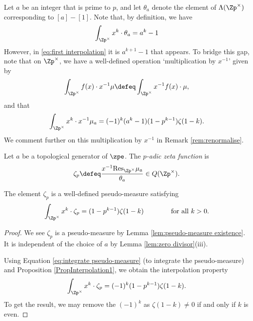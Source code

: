 \documentclass[a4paper,10pt, english, reqno]{smfart}
\numberwithin{equation}{section}
\begin{document}
\begin{definition}
Let $a$ be an integer that is prime to $p$, and let $\theta_{a}$ denote the element of $\Lambda(\Zp^\times)$ corresponding to $[a] - [1]$. Note that, by definition, we have
\[
\int_{\Zp^\times} x^k \cdot\theta_{a} = a^k - 1
\]
However, in \eqref{eq:first interpolation} it is $a^{k+1} -1$ that appears. To bridge this gap, note that on $\Zp^\times$, we have a well-defined operation `multiplication by $x^{-1}$' given by
\begin{equation}\label{eq:mult by xinverse}
	\int_{\Zp^\times} f(x) \cdot x^{-1}\mu \defeq \int_{\Zp^\times} x^{-1}f(x) \cdot \mu,
\end{equation}
and that 
\[
	\int_{\Zp^\times} x^k \cdot x^{-1} \mu_a = (-1)^k(a^k-1)(1-p^{k-1})\zeta(1-k).
\]
We comment further on this  multiplication by $x^{-1}$ in Remark \ref{rem:renormalise}. 

\begin{definition} \label{DefZetap}
Let $a$ be a topological generator of $\zpe$. The \emph{$p$-adic zeta function} is
\[
	\zeta_p \defeq \frac{x^{-1}\mathrm{Res}_{\Zp^\times}\mu_a}{\theta_a} \in Q(\Zp^\times).
\]
\end{definition}
\end{definition}





\begin{proposition} \label{PropInterpolation2}
The element $\zeta_p$ is a well-defined pseudo-measure satisfying
\[
\int_{\Zp^\times} x^k \cdot \zeta_p = (1-p^{k-1})\zeta(1-k) \qquad\qquad \text{for all }k > 0.
\]
\end{proposition}

\begin{proof}
We see $\zeta_p$ is a pseudo-measure by Lemma \ref{lem:pseudo-measure existence}. It is independent of the choice of $a$ by Lemma \ref{lem:zero divisor}(iii). 


Using Equation \eqref{eq:integrate pseudo-measure} (to integrate the pseudo-measure) and Proposition \ref{PropInterpolation1}, we obtain the interpolation property
 \[
\int_{\Zp^\times} x^k \cdot \zeta_p = (-1)^k(1-p^{k-1})\zeta(1-k).
\]
To get the result, we may remove the $(-1)^{k}$ as $\zeta(1-k) \neq 0$ if and only if $k$ is even.   
\end{proof}
\end{document}
